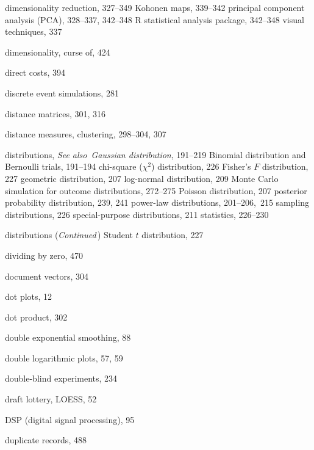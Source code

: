 \documentclass{Oreilly5980006}
\def\seealso{{\it See also}\ }
\begin{document}
\begin{theindex}
  \item dimensionality reduction, 327--349
    \subitem Kohonen maps, 339--342
    \subitem principal component analysis (PCA), 328--337, 342--348
    \subitem R statistical analysis package, 342--348
    \subitem visual techniques, 337
  \item dimensionality, curse of, 424
  \item direct costs, 394
  \item discrete event simulations, 281
  \item distance matrices, 301, 316
  \item distance measures, clustering, 298--304, 307
  \item distributions, \seealso{}{\it Gaussian distribution}, 191--219
    \subitem Binomial distribution and Bernoulli trials, 191--194
    \subitem chi-square ($\chi^2$) distribution, 226
    \subitem Fisher's $F$ distribution, 227
    \subitem geometric distribution, 207
    \subitem log-normal distribution, 209
    \subitem Monte Carlo simulation  for outcome distributions, 272--275
    \subitem Poisson distribution, 207
    \subitem posterior probability distribution, 239, 241
    \subitem power-law distributions, 201--206,~215
    \subitem sampling distributions, 226
    \subitem special-purpose distributions, 211
    \subitem statistics, 226--230
  \item distributions ({\it Continued\,})
    \subitem Student $t$ distribution, 227
  \item dividing by zero, 470
  \item document vectors, 304
  \item dot plots, 12
  \item dot product, 302
  \item double exponential smoothing, 88
  \item double logarithmic plots, 57, 59
  \item double-blind experiments, 234
  \item draft lottery, LOESS, 52
  \item DSP (digital signal processing), 95
  \item duplicate records, 488\vspace*{-5pt}

  \indexspace


\end{theindex}
\end{document}
